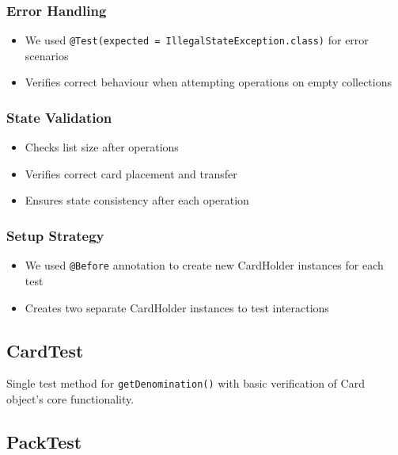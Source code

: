 \documentclass{article}
\begin{document}
    \subsubsection{Error Handling}
    \begin{itemize}
        \item We used \texttt{@Test(expected = IllegalStateException.class)} for error scenarios
        \item Verifies correct behaviour when attempting operations on empty collections
    \end{itemize}

    \subsubsection{State Validation}
    \begin{itemize}
        \item Checks list size after operations
        \item Verifies correct card placement and transfer
        \item Ensures state consistency after each operation
    \end{itemize}

    \subsubsection{Setup Strategy}
    \begin{itemize}
        \item We used \texttt{@Before} annotation to create new CardHolder instances for each test
        \item Creates two separate CardHolder instances to test interactions
    \end{itemize}

    \subsection{CardTest}
    Single test method for \texttt{getDenomination()} with basic verification of Card object's core functionality.

    \subsection{PackTest}
\end{document}
